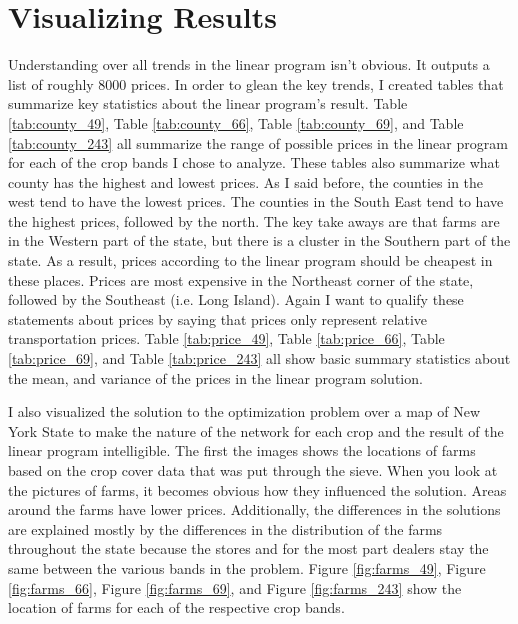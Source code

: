 \documentclass{report}
\begin{document}
\section{Visualizing Results}

Understanding over all trends in the linear program isn't obvious. It outputs a list of roughly 8000 prices. In order to glean the key trends, I created tables that summarize key statistics about the linear program's result. Table \ref{tab:county_49}, Table \ref{tab:county_66}, Table \ref{tab:county_69}, and Table \ref{tab:county_243} all summarize the range of possible prices in the linear program for each of the crop bands I chose to analyze. These tables also summarize what county has the highest and lowest prices. As I said before, the counties in the west tend to have the lowest prices. The counties in the South East tend to have the highest prices, followed by the north. The key take aways are that farms are in the Western part of the state, but there is a cluster in the Southern part of the state. As a result, prices according to the linear program should be cheapest in these places. Prices are most expensive in the Northeast corner of the state, followed by the Southeast (i.e. Long Island). Again I want to qualify these statements about prices by saying that prices only represent relative transportation prices. Table  \ref{tab:price_49}, Table  \ref{tab:price_66}, Table  \ref{tab:price_69}, and Table  \ref{tab:price_243} all show basic summary statistics about the mean, and variance of the prices in the linear program solution.

I also visualized the solution to the optimization problem over a map of New York State to make the nature of the network for each crop and the result of the linear program intelligible. The first the images shows the locations of farms based on the crop cover data that was put through the sieve. When you look at the pictures of farms, it becomes obvious how they influenced the solution. Areas around the farms have lower prices. Additionally, the differences in the solutions are explained mostly by the differences in the distribution of the farms throughout the state because  the stores and for the most part dealers stay the same between the various bands in the problem. Figure \ref{fig:farms_49}, Figure \ref{fig:farms_66}, Figure \ref{fig:farms_69}, and Figure \ref{fig:farms_243} show the location of farms for each of the respective crop bands.
\end{document}
